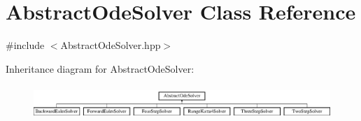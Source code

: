 \hypertarget{class_abstract_ode_solver}{}\section{Abstract\+Ode\+Solver Class Reference}
\label{class_abstract_ode_solver}


{\ttfamily \#include $<$Abstract\+Ode\+Solver.\+hpp$>$}

Inheritance diagram for Abstract\+Ode\+Solver\+:\begin{figure}[H]
\begin{center}
\leavevmode
\includegraphics[height=1.305361cm]{class_abstract_ode_solver}
\end{center}
\end{figure}
